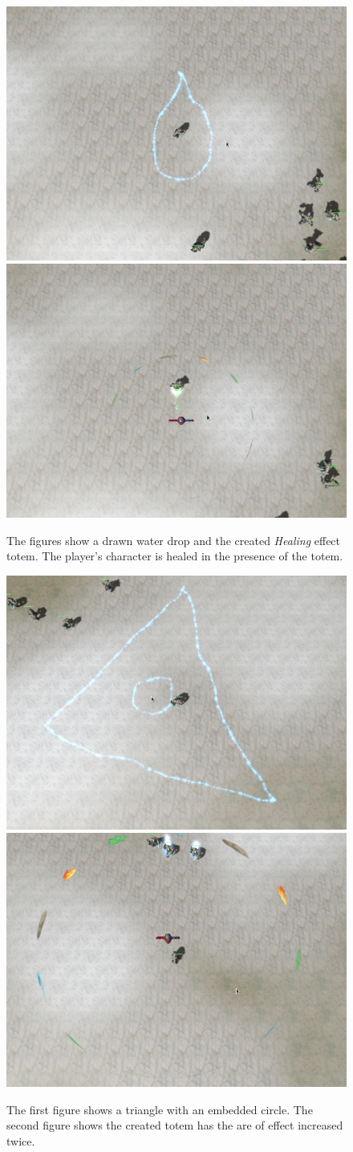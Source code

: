 \begin{figure}[p]
\centering
\includegraphics[width=.47\linewidth]{ext/scr/waterDrop.png}
\quad
\includegraphics[width=.47\linewidth]{ext/scr/waterDrope.png}
\caption{The figures show a drawn water drop and the created \emph{Healing} effect totem. The player's character is healed in the presence of the totem.}
\label{fig:spell:waterDrop}
\end{figure}

\begin{figure}[p]
\centering
\includegraphics[width=.47\linewidth]{ext/scr/embcircle.png}
\quad
\includegraphics[width=.47\linewidth]{ext/scr/embcirclee.png}
\caption{The first figure shows a triangle with an embedded circle. The second figure shows the created totem has the are of effect increased twice. }
\label{fig:spell:embcircle}
\end{figure}


